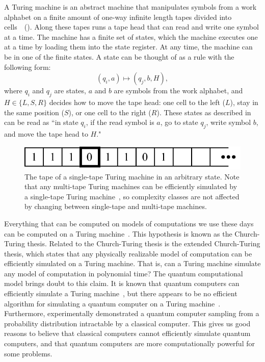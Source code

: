 A Turing machine is an abstract machine that manipulates symbols from a work alphabet on a finite amount of one-way infinite length tapes divided into cells~\cite{turing1937computable}~().
Along these tapes runs a tape head that can read and write one symbol at a time.
The machine has a finite set of states, which the machine executes one at a time by loading them into the state register.
At any time, the machine can be in one of the finite states.
A state can be thought of as a rule with the following form:
\begin{equation} \label{eqn:turing-state}
(q_i,a) \mapsto (q_j,b,H),
\end{equation}
where $q_i$ and $q_j$ are states, $a$ and $b$ are symbols from the work alphabet, and $H \in \{L, S, R\}$ decides how to move the tape head: one cell to the left ($L$), stay in the same position ($S$), or one cell to the right ($R$).
These states as described in  can be read as ``in state $q_i$, if the read symbol is $a$, go to state $q_j$, write symbol $b$, and move the tape head to $H$."

\begin{figure}[ht]
    \centering
    \includegraphics[width=0.5\linewidth]{figures/single-tape-turing-machine.pdf}
    \caption[The tape of a single-tape Turing machine in an arbitrary state.]{
        The tape of a single-tape Turing machine in an arbitrary state.
        Note that any multi-tape Turing machines can be efficiently simulated by a single-tape Turing machine~\cite{hartmanis1965computational}, so complexity classes are not affected by changing between single-tape and multi-tape machines.
    }
    \label{fig:single-tape-turing-machine}
\end{figure}

Everything that can be computed on models of computations we use these days can be computed on a Turing machine~\cite{dershowitz2008natural}.
This hypothesis is known as the Church-Turing thesis.
Related to the Church-Turing thesis is the extended Church-Turing thesis, which states that any physically realizable model of computation can be efficiently simulated on a Turing machine.
That is, can a Turing machine simulate any model of computation in polynomial time?
The quantum computational model brings doubt to this claim.
It is known that quantum computers can efficiently simulate a Turing machine~\cite{bennett1973logical}, but there appears to be no efficient algorithm for simulating a quantum computer on a Turing machine~\cite{deutsch1985quantum}.
Furthermore, \textcite{arute2019quantum} experimentally demonstrated a quantum computer sampling from a probability distribution intractable by a classical computer.
This gives us good reasons to believe that classical computers cannot efficiently simulate quantum computers, and that quantum computers are more computationally powerful for some problems.

